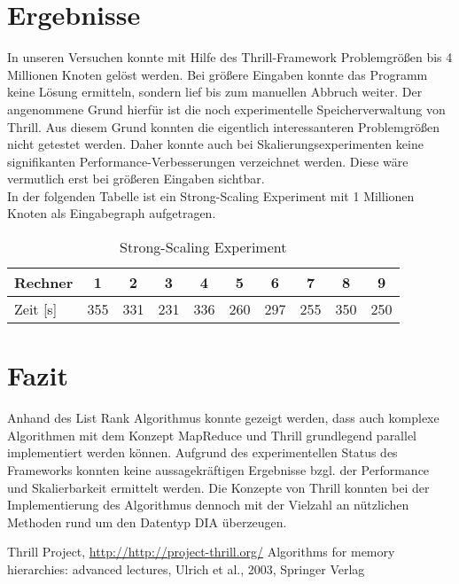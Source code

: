 \documentclass[a0,portrait]{a0poster}
\begin{document}
\begin{multicols}{2}
\section*{Ergebnisse}

In unseren Versuchen konnte mit Hilfe des Thrill-Framework Problemgrößen bis 4 Millionen Knoten gelöst werden. Bei größere Eingaben konnte das Programm keine Lösung ermitteln, sondern lief bis zum manuellen Abbruch weiter. Der angenommene Grund hierfür ist die noch experimentelle Speicherverwaltung von Thrill. Aus diesem Grund konnten die eigentlich interessanteren Problemgrößen nicht getestet werden. Daher konnte auch bei Skalierungsexperimenten keine signifikanten Performance-Verbesserungen verzeichnet 
werden. Diese wäre vermutlich erst bei größeren Eingaben sichtbar.\\
In der folgenden Tabelle ist ein Strong-Scaling Experiment mit 1 Millionen Knoten als Eingabegraph
aufgetragen.

\begin{table}          %
\centering
\begin{tabular*}{\linewidth}{@{\extracolsep{\fill}}lccccccccc}
\hline
\hline
\rule[-7pt]{0pt}{23pt}  Rechner & 1 & 2 & 3 & 4 & 5 & 6 & 7 & 8 & 9\\
\hline
\rule[-6pt]{0pt}{21pt}   Zeit [s] & 355 & 331 & 231 & 336 & 260 & 297 & 255 & 350 & 250\\
\hline
\hline
\hline
\end{tabular*}  
\caption[]{Strong-Scaling Experiment} 
\end{table}


\section*{Fazit}
Anhand des List Rank Algorithmus konnte gezeigt werden, dass auch komplexe Algorithmen mit dem Konzept MapReduce und Thrill grundlegend parallel implementiert werden können. Aufgrund des experimentellen Status des Frameworks konnten keine aussagekräftigen Ergebnisse bzgl. der Performance und Skalierbarkeit ermittelt werden. Die Konzepte von Thrill konnten bei der Implementierung des Algorithmus dennoch mit der Vielzahl an nützlichen Methoden rund um den Datentyp DIA überzeugen. 

\begin{thebibliography}{}    %
	 Thrill Project, \url{http://http://project-thrill.org/}
	 Algorithms for memory hierarchies: advanced lectures, Ulrich et al., 2003, Springer Verlag
\end{thebibliography}
       
\end{multicols}
\end{document}
